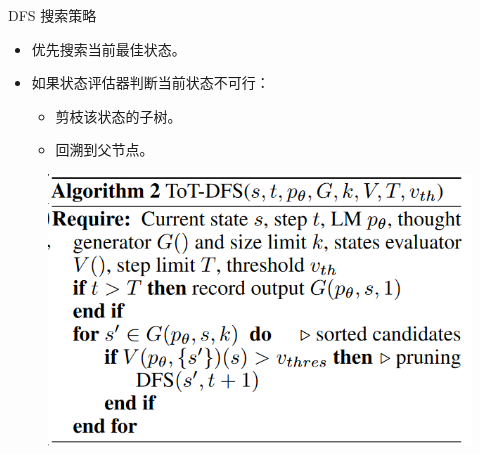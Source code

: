 \begin{frame}{DFS 搜索策略}
\begin{itemize}
    \item 优先搜索当前最佳状态。
    \item 如果状态评估器判断当前状态不可行：
    \begin{itemize}
        \item 剪枝该状态的子树。
        \item 回溯到父节点。
    \end{itemize}
\end{itemize}
\begin{figure}
	\centering
	\includegraphics[width=.5\linewidth]{./pic/11.png}
\end{figure}
\end{frame}